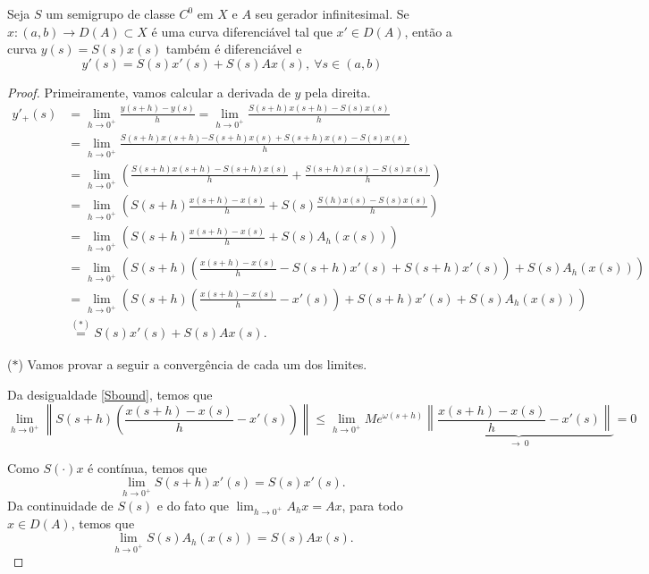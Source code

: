 \begin{proposition}
Seja $S$ um semigrupo de classe $C^0$ em $X$ e $A$ seu gerador infinitesimal. Se  $x:(a,b)\to D(A)\subset X$ é uma curva diferenciável tal que  $x'\in D(A)$, então a curva $y(s)=S(s)x(s)$ também é diferenciável e
\begin{equation}\label{reg.cad}
y'(s)=S(s)x'(s)+S(s)Ax(s),\ \forall s\in (a,b)
\end{equation}
\end{proposition}
\begin{proof}
Primeiramente, vamos calcular a derivada de $y$ pela direita.
\begin{align*}
y'_+(s)& = \lim\limits_{h\to 0^+}\frac{y(s+h)-y(s)}{h}
=\lim\limits_{h\to 0^+}\frac{S(s+h)x(s+h)-S(s)x(s)}{h}\\
& =\lim\limits_{h\to 0^+}\frac{S(s+h)x(s+h){-S(s+h)x(s)+S(s+h)x(s)}-S(s)x(s)}{h}\\
& =\lim\limits_{h\to 0^+}\left(\frac{S(s+h)x(s+h)-S(s+h)x(s)}{h}+\frac{S(s+h)x(s)-S(s)x(s)}{h}\right)
\\
& =\lim\limits_{h\to 0^+}\left(S(s+h)\frac{x(s+h)-x(s)}{h}+S(s)\frac{S(h)x(s)-S(s)x(s)}{h}\right)\\
& =\lim\limits_{h\to 0^+}\left(S(s+h)\frac{x(s+h)-x(s)}{h}+S(s)A_h(x(s))\right)\\
& =\lim\limits_{h\to 0^+}\left(S(s+h)\left(\frac{x(s+h)-x(s)}{h}-S(s+h)x'(s)+S(s+h)x'(s)\right)
+S(s)A_h(x(s))\right)\\
& =\lim\limits_{h\to 0^+}\left(S(s+h)\left(\frac{x(s+h)-x(s)}{h}-x'(s)\right)+S(s+h)x'(s)
+S(s)A_h(x(s))\right)\\
&\stackrel{(\ast)}{=}S(s)x'(s)+S(s)Ax(s).
\end{align*}

\noindent($\ast$) Vamos provar a seguir a convergência de cada um dos limites.

Da desigualdade \eqref{Sbound}, temos que 
\begin{equation*}
\lim\limits_{h\to 0^+}\left\|S(s+h)\left(\frac{x(s+h)-x(s)}{h}-x'(s)\right)\right\|
\leq \lim\limits_{h\to 0^+}
Me^{\omega(s+h)}\underbrace{\left\|\frac{x(s+h)-x(s)}{h}-x'(s)\right\|}_{\to\  0}
=0
\end{equation*}

Como $S(\cdot)x$ é contínua, temos que
\[
\lim\limits_{h\to 0^+}S(s+h)x'(s)=S(s)x'(s).
\]
Da continuidade de $S(s)$ e do fato que $\lim_{h \to 0^+}A_hx=Ax$, para todo $x\in D(A)$, temos que 
\[
\lim\limits_{h\to 0^+}S(s)A_h(x(s))=S(s)Ax(s).
\]


\end{proof}
